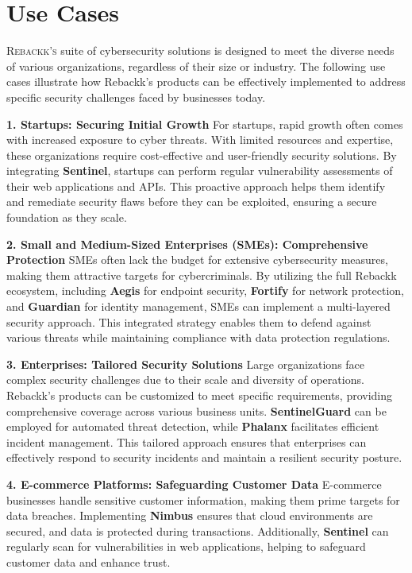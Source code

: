 \chapter{Use Cases}

\lettrine{R}{ebackk's} suite of cybersecurity solutions is designed to meet the diverse needs of various organizations, regardless of their size or industry. The following use cases illustrate how Rebackk's products can be effectively implemented to address specific security challenges faced by businesses today.

\textbf{1. Startups: Securing Initial Growth}  
For startups, rapid growth often comes with increased exposure to cyber threats. With limited resources and expertise, these organizations require cost-effective and user-friendly security solutions. By integrating \textbf{Sentinel}, startups can perform regular vulnerability assessments of their web applications and APIs. This proactive approach helps them identify and remediate security flaws before they can be exploited, ensuring a secure foundation as they scale.

\textbf{2. Small and Medium-Sized Enterprises (SMEs): Comprehensive Protection}  
SMEs often lack the budget for extensive cybersecurity measures, making them attractive targets for cybercriminals. By utilizing the full Rebackk ecosystem, including \textbf{Aegis} for endpoint security, \textbf{Fortify} for network protection, and \textbf{Guardian} for identity management, SMEs can implement a multi-layered security approach. This integrated strategy enables them to defend against various threats while maintaining compliance with data protection regulations.

\textbf{3. Enterprises: Tailored Security Solutions}  
Large organizations face complex security challenges due to their scale and diversity of operations. Rebackk's products can be customized to meet specific requirements, providing comprehensive coverage across various business units. \textbf{SentinelGuard} can be employed for automated threat detection, while \textbf{Phalanx} facilitates efficient incident management. This tailored approach ensures that enterprises can effectively respond to security incidents and maintain a resilient security posture.

\textbf{4. E-commerce Platforms: Safeguarding Customer Data}  
E-commerce businesses handle sensitive customer information, making them prime targets for data breaches. Implementing \textbf{Nimbus} ensures that cloud environments are secured, and data is protected during transactions. Additionally, \textbf{Sentinel} can regularly scan for vulnerabilities in web applications, helping to safeguard customer data and enhance trust.

